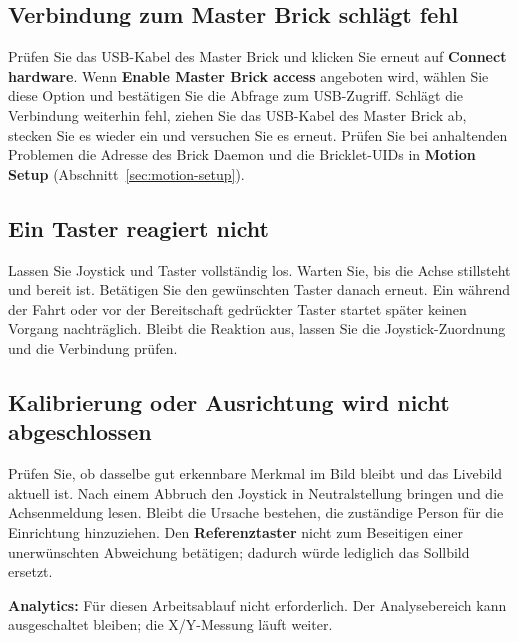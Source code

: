 \documentclass[a4paper,11pt]{article}
\newcommand{\Referenz}{\textbf{Referenztaster}}
\begin{document}
\subsection{Verbindung zum Master Brick schlägt fehl}
\label{sec:connection-issues}

Prüfen Sie das USB-Kabel des Master Brick und klicken Sie erneut auf
\textbf{Connect hardware}. Wenn \textbf{Enable Master Brick access} angeboten
wird, wählen Sie diese Option und bestätigen Sie die Abfrage zum USB-Zugriff.
Schlägt die Verbindung weiterhin fehl, ziehen Sie das USB-Kabel des Master
Brick ab, stecken Sie es wieder ein und versuchen Sie es erneut. Prüfen Sie
bei anhaltenden Problemen die Adresse des Brick Daemon und die Bricklet-UIDs
in \textbf{Motion Setup} (Abschnitt~\ref{sec:motion-setup}).

\subsection{Ein Taster reagiert nicht}

Lassen Sie Joystick und Taster vollständig los. Warten Sie, bis die Achse
stillsteht und bereit ist. Betätigen Sie den gewünschten Taster danach erneut.
Ein während der Fahrt oder vor der Bereitschaft gedrückter Taster startet
später keinen Vorgang nachträglich. Bleibt die Reaktion aus, lassen Sie die
Joystick-Zuordnung und die Verbindung prüfen.

\subsection{Kalibrierung oder Ausrichtung wird nicht abgeschlossen}

Prüfen Sie, ob dasselbe gut erkennbare Merkmal im Bild bleibt und das Livebild
aktuell ist. Nach einem Abbruch den Joystick in Neutralstellung bringen und
die Achsenmeldung lesen. Bleibt die Ursache bestehen, die zuständige Person
für die Einrichtung hinzuziehen. Den \Referenz{} nicht zum Beseitigen einer
unerwünschten Abweichung betätigen; dadurch würde lediglich das Sollbild ersetzt.

\smallskip
\textbf{Analytics:} Für diesen Arbeitsablauf nicht erforderlich. Der
Analysebereich kann ausgeschaltet bleiben; die X/Y-Messung läuft weiter.

\label{LastPage}
\end{document}
